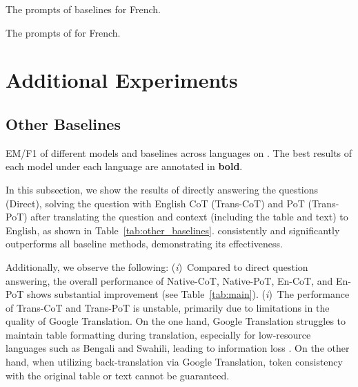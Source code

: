 \begin{table*}[ht]
    \centering
    \small
    
    \caption{
    The prompts of baselines for French.
    }
    \label{tab:prompt_baseline}
\end{table*}

\begin{table*}[ht]
    \centering
    \small
    
    \caption{
    The prompts of \ourmethod for French.
    }
    \label{tab:prompt_our_method}
\end{table*}


\section{Additional Experiments}
\label{sec:Additional Experiments}

\subsection{Other Baselines}
\label{subsec:otherbaselines}

\begin{table*}[ht]
\centering
\small

\caption{
EM/F1 of different models and baselines across languages on \ourdataset.
The best results of each model under each language are annotated in \textbf{bold}. 
}
\label{tab:other_baselines}
\end{table*}

In this subsection, we show the results of directly answering the questions (Direct), solving the question with English CoT (Trans-CoT) and PoT (Trans-PoT) after translating the question and context (including the table and text) to English, as shown in Table~\ref{tab:other_baselines}.
\ourmethod consistently and significantly outperforms all baseline methods, demonstrating its effectiveness. 

Additionally, we observe the following:
(\emph{i})~Compared to direct question answering, the overall performance of Native-CoT, Native-PoT, En-CoT, and En-PoT shows substantial improvement (see Table~\ref{tab:main}).
(\emph{i})~The performance of Trans-CoT and Trans-PoT is unstable, primarily due to limitations in the quality of Google Translation. 
On the one hand, Google Translation struggles to maintain table formatting during translation, especially for low-resource languages such as Bengali and Swahili, leading to information loss \cite{MultiSpider}. 
On the other hand, when utilizing back-translation via Google Translation, token consistency with the original table or text cannot be guaranteed.


